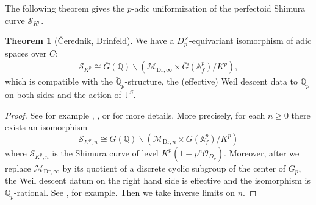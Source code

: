 \documentclass{article}
\theoremstyle{definition}
\newtheorem{theorem}{Theorem}[section]
\def\calM{\mathcal{M}}
\def\calO{\mathcal{O}}
\def\calS{\mathcal{S}}
\def\bbA{\mathbb{A}}
\def\bbQ{\mathbb{Q}}
\def\bbT{\mathbb{T}}
\def\bs{\backslash}
\def\isom{\cong}
\def\bar{\overline}
\def\Dr{\mathrm{Dr}}
\begin{document}
The following theorem gives the $p$-adic uniformization of the perfectoid Shimura curve $\calS_{K^p}$.
\begin{theorem}[\v{C}erednik, Drinfeld]\label{thm:padicuniformization}
We have a $D_p^\times$-equivariant isomorphism of adic spaces over $C$:
\begin{align}\label{eq:padicuniformization}
    \calS_{K^p}\isom \bar G(\bbQ)\bs (\calM_{\Dr,\infty}\times \bar G(\bbA_f^p)/K^p),
\end{align}
which is compatible with the $\breve{\bbQ}_p$-structure, the (effective) Weil descent data to $\bbQ_p$ on both sides and the action of $\bbT^S$.
\end{theorem}
\begin{proof}
See for example \cite{Dr76}, \cite[Theorem III]{RZ96}, \cite{BZ00,boutot2022uniformization} or \cite[\S 6]{Scholze2018LubinTate} for more details. More precisely, for each $n\ge 0$ there exists an isomorphism 
\[ \calS_{K^p,n}\isom \bar G(\bbQ)\bs (\calM_{\Dr,n}\times \bar G(\bbA_f^p)/K^p)\]
where $\calS_{K^p,n}$ is the Shimura curve of level $K^p(1+p^n\calO_{D_p})$. Moreover, after we replace $\calM_{\Dr,\infty}$ by its quotient of a discrete cyclic subgroup of the center of $\bar G_p$, the Weil descent datum on the right hand side is effective and the isomorphism is $\bbQ_p$-rational. See \cite[Proposition 6.16]{RZ96}, \cite[(A.11)]{harris1997supercuspidal} for example. Then we take inverse limits on $n$.
\end{proof}
\end{document}
